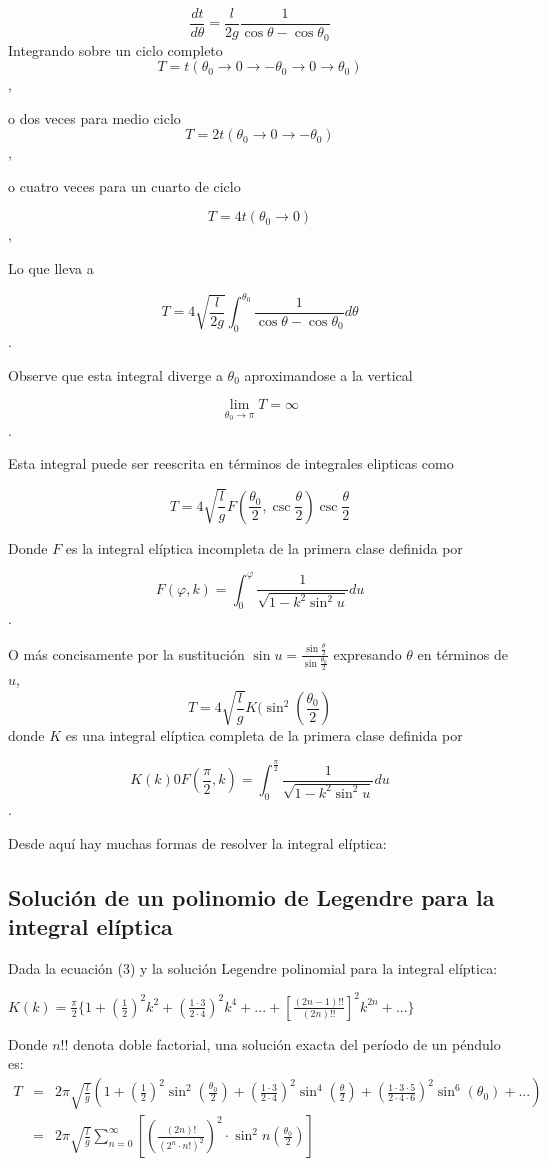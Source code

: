 \documentclass[12pt]{article}
\begin{document}
$$\frac{dt}{d\theta} = \frac{l}{2g} \frac{1}{\cos \theta - \cos \theta_0} $$
Integrando sobre un ciclo completo
$$T=t(\theta_0 \rightarrow 0 \rightarrow -\theta_0 \rightarrow 0 \rightarrow \theta_0)$$,

o dos veces para medio ciclo
$$T=2t(\theta_0 \rightarrow 0 \rightarrow -\theta_0)$$,

o cuatro veces para un cuarto de ciclo

$$T=4t(\theta_0 \rightarrow 0)$$,

Lo que lleva a 

$$T= 4\sqrt{\frac{l}{2g}} \int_{0}^{\theta_0}\frac{1}{\cos \theta - \cos \theta_0}d\theta$$.

Observe que esta integral diverge a $\theta_0$ aproximandose a la vertical

$$\lim\limits_{\theta_0\to\pi} T = \infty$$.

Esta integral puede ser reescrita en términos de integrales elipticas como

$$T= 4 \sqrt{\frac{l}{g}} F(\frac{\theta_0}{2}, \csc\frac{\theta}{2})\csc\frac{\theta}{2}$$

Donde $F$ es la integral elíptica incompleta de la primera clase definida por

$$F(\varphi, k) = \int_{0}^{\varphi} \frac{1}{\sqrt{1-k^2\sin^2u}} du$$.

O más concisamente por la sustitución $\sin u = \frac{\sin \frac{\theta}{2}}{\sin \frac{\theta_0}{2}}$ expresando $\theta$ en términos de $u$,
\begin{equation}
\nonumber T= 4 \sqrt{\frac{l}{g}}K(\sin^2 (\frac{\theta_0}{2})
\end{equation}
donde $K$ es una integral elíptica completa de la primera clase definida por

$$K(k)0 F (\frac{\pi}{2},k)=\int_{0}^{\frac{\pi}{2}}\frac{1}{\sqrt{1-k^2\sin^2u}} du$$.

Desde aquí hay muchas formas de resolver la integral elíptica:

\subsection{Solución de un polinomio de Legendre para la integral elíptica}
Dada la ecuación (3) y la solución Legendre polinomial para la integral elíptica:

$K(k)=\frac{\pi}{2}\{1+(\frac{1}{2})^2 k^2 + (\frac{1 \cdot 3 }{2 \cdot 4})^2k^4 + ...+ [\frac{(2n-1)!!}{(2n)!!}]^2k^{2n}+...\}$

Donde $n!!$ denota doble factorial, una solución exacta del período de un péndulo es:
\begin{eqnarray}
\nonumber T & = & 2\pi\sqrt{\frac{l}{g}} (1+(\frac{1}{2})^2\sin^2 (\frac{\theta_0}{2})+(\frac{1 \cdot 3 }{2 \cdot 4})^2\sin^4(\frac{\theta}{2})+(\frac{1 \cdot 3 \cdot 5}{2 \cdot 4 \cdot 6})^2\sin^6(\theta_0)+...) \\
\nonumber & = & 2\pi \sqrt{\frac{l}{g}} \sum_{n=0}^{\infty}[(\frac{(2n)!}{(2^n \cdot n!)^2})^2 \cdot \sin^2n(\frac{\theta_0}{2})]
\end{eqnarray}
\end{document}
